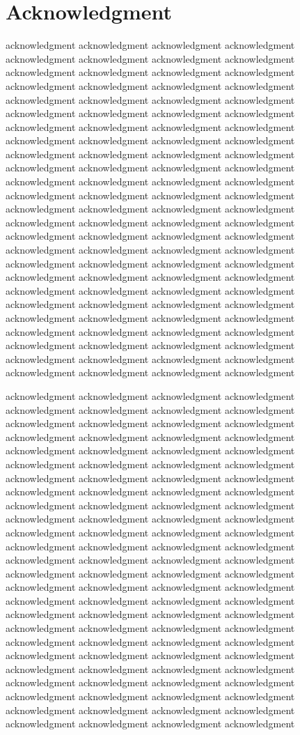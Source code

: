 \documentclass[platex,ja=standard,12pt,a4paper,twoside,onecolumn,fleqn,dvipdfmx,english]{bxjsbook}
\begin{document}
\chapter{Acknowledgment}
acknowledgment acknowledgment acknowledgment acknowledgment acknowledgment acknowledgment acknowledgment acknowledgment acknowledgment acknowledgment acknowledgment acknowledgment acknowledgment acknowledgment acknowledgment acknowledgment acknowledgment acknowledgment acknowledgment acknowledgment acknowledgment acknowledgment acknowledgment acknowledgment acknowledgment acknowledgment acknowledgment acknowledgment acknowledgment acknowledgment acknowledgment acknowledgment acknowledgment acknowledgment acknowledgment acknowledgment acknowledgment acknowledgment acknowledgment acknowledgment acknowledgment acknowledgment acknowledgment acknowledgment acknowledgment acknowledgment acknowledgment acknowledgment acknowledgment acknowledgment acknowledgment acknowledgment acknowledgment acknowledgment acknowledgment acknowledgment acknowledgment acknowledgment acknowledgment acknowledgment acknowledgment acknowledgment acknowledgment acknowledgment acknowledgment acknowledgment acknowledgment acknowledgment acknowledgment acknowledgment acknowledgment acknowledgment acknowledgment acknowledgment acknowledgment acknowledgment acknowledgment acknowledgment acknowledgment acknowledgment acknowledgment acknowledgment acknowledgment acknowledgment acknowledgment acknowledgment acknowledgment acknowledgment acknowledgment acknowledgment acknowledgment acknowledgment acknowledgment acknowledgment acknowledgment acknowledgment acknowledgment acknowledgment acknowledgment acknowledgment

acknowledgment acknowledgment acknowledgment acknowledgment acknowledgment acknowledgment acknowledgment acknowledgment acknowledgment acknowledgment acknowledgment acknowledgment acknowledgment acknowledgment acknowledgment acknowledgment acknowledgment acknowledgment acknowledgment acknowledgment acknowledgment acknowledgment acknowledgment acknowledgment acknowledgment acknowledgment acknowledgment acknowledgment acknowledgment acknowledgment acknowledgment acknowledgment acknowledgment acknowledgment acknowledgment acknowledgment acknowledgment acknowledgment acknowledgment acknowledgment acknowledgment acknowledgment acknowledgment acknowledgment acknowledgment acknowledgment acknowledgment acknowledgment acknowledgment acknowledgment acknowledgment acknowledgment acknowledgment acknowledgment acknowledgment acknowledgment acknowledgment acknowledgment acknowledgment acknowledgment acknowledgment acknowledgment acknowledgment acknowledgment acknowledgment acknowledgment acknowledgment acknowledgment acknowledgment acknowledgment acknowledgment acknowledgment acknowledgment acknowledgment acknowledgment acknowledgment acknowledgment acknowledgment acknowledgment acknowledgment acknowledgment acknowledgment acknowledgment acknowledgment acknowledgment acknowledgment acknowledgment acknowledgment acknowledgment acknowledgment acknowledgment acknowledgment acknowledgment acknowledgment acknowledgment acknowledgment acknowledgment acknowledgment acknowledgment acknowledgment
\end{document}
